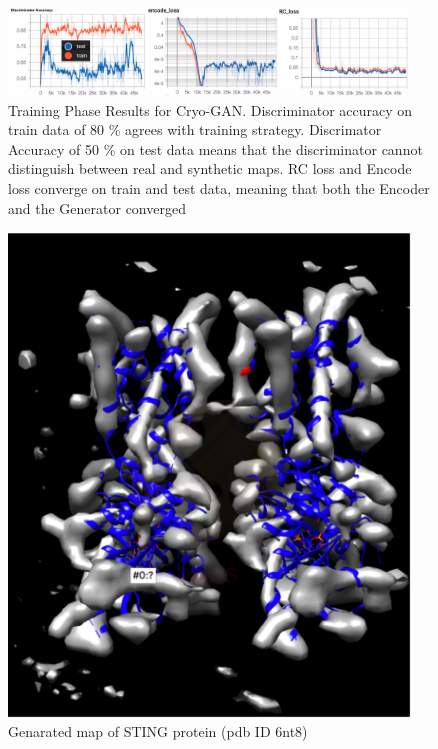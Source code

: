 \begin{figure}[!ht]
\includegraphics[width=0.95\textwidth]{picsnew/gan_res.png}
\caption{Training Phase Results for Cryo-GAN. Discriminator accuracy on train data of 80 \% agrees with training strategy. Discrimator Accuracy of 50 \% on test data means that the discriminator cannot distinguish between real and synthetic maps. RC loss and Encode loss converge on train and test data, meaning that both the Encoder and the Generator converged}\label{f:gan_res}
\end{figure}

\begin{figure}[!ht]
\includegraphics[width=0.95\textwidth]{picsnew/6nt8_newsim.png}
\caption{Genarated map of STING protein (pdb ID 6nt8) }\label{f:6nt8_newsim}
\end{figure}

